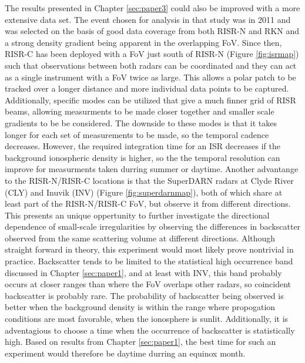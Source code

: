 The results presented in Chapter \ref{sec:paper3} could also be improved with a more extensive data set.  The event chosen for analysis in that study was in 2011 and was selected on the basis of good data coverage from both RISR-N and RKN and a strong density gradient being apparent in the overlapping FoV.  Since then, RISR-C has been deployed with a FoV just south of RISR-N (Figure \ref{fig:isrmap}) such that observations between both radars can be coordinated and they can act as a single instrument with a FoV twice as large.  This allows a polar patch to be tracked over a longer distance and more individual data points to be captured.  Additionally, specific modes can be utilized that give a much finner grid of RISR beams, allowing measurments to be made closer together and smaller scale gradients to be be considered.  The downside to these modes is that it takes longer for each set of measurements to be made, so the temporal cadence decreases.  However, the required integration time for an ISR decreases if the background ionospheric density is higher, so the the temporal resolution can improve for measurments taken durring summer or daytime.  Another advantange to the RISR-N/RISR-C locations is that the SuperDARN radars at Clyde River (CLY) and Inuvik (INV) (Figure \ref{fig:superdarnmap}), both of which share at least part of the RISR-N/RISR-C FoV, but observe it from different directions.  This presents an unique oppertunity to further investigate the directional dependence of small-scale irregularities by observing the differences in backscatter observed from the same scattering volume at different directions.  Although straight forward in theory, this experiment would most likely prove nontrivial in practice.  Backscatter tends to be limited to the statistical high occurrence band discussed in Chapter \ref{sec:paper1}, and at least with INV, this band probably occurs at closer ranges than where the FoV overlaps other radars, so coincident backscatter is probably rare.  The probability of backscatter being observed is better when the background density is within the range where propogation conditions are most favorable, when the ionosphere is sunlit.  Additionally, it is adventagious to choose a time when the occurrence of backscatter is statistically high.  Based on results from Chapter \ref{sec:paper1}, the best time for such an experiment would therefore be daytime durring an equinox month.

